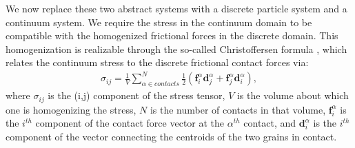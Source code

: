 We now replace these two abstract systems with a discrete particle system and a continuum system. We require the stress in the continuum domain to be compatible with the homogenized frictional forces in the discrete domain. This homogenization is realizable through the so-called Christoffersen formula \cite{Christoffersen:1981:Micromechanical}, which relates the continuum stress to the discrete frictional contact forces via:
\begin{align}
\sigma_{ij} = \frac{1}{V} \sum_{\alpha \in contacts}^{N}{\frac{1}{2}(\boldsymbol{f}_i^\alpha \boldsymbol{d}_j^\alpha + \boldsymbol{f}_j^\alpha \boldsymbol{d}_i^\alpha)} , 
\end{align}
where $\sigma_{ij}$ is the (i,j) component of the stress tensor, $V$ is the volume 
about which one is homogenizing the stress, $N$ is the number of contacts in 
that volume, $\boldsymbol{f}_i^\alpha$ is the $i^{th}$ component of the contact 
force vector at the $\alpha^{th}$ contact, and $\boldsymbol{d}_i^\alpha$ is the
$i^{th}$ component of the vector connecting the centroids of the two grains in contact.

